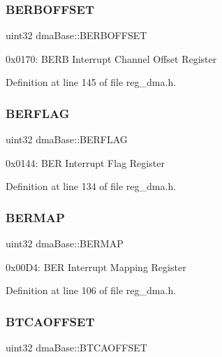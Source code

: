 \subsubsection{\texorpdfstring{B\+E\+R\+B\+O\+F\+F\+S\+ET}{BERBOFFSET}}
{\footnotesize\ttfamily uint32 dma\+Base\+::\+B\+E\+R\+B\+O\+F\+F\+S\+ET}

0x0170\+: B\+E\+RB Interrupt Channel Offset Register 

Definition at line 145 of file reg\+\_\+dma.\+h.

\mbox{\label{structdmaBase_ab280d5d5042d2cab2fd4ef24674acb21}} 
\subsubsection{\texorpdfstring{B\+E\+R\+F\+L\+AG}{BERFLAG}}
{\footnotesize\ttfamily uint32 dma\+Base\+::\+B\+E\+R\+F\+L\+AG}

0x0144\+: B\+ER Interrupt Flag Register 

Definition at line 134 of file reg\+\_\+dma.\+h.

\mbox{\label{structdmaBase_a0f2a81d7ffa07b100bd3581e43140e9d}} 
\subsubsection{\texorpdfstring{B\+E\+R\+M\+AP}{BERMAP}}
{\footnotesize\ttfamily uint32 dma\+Base\+::\+B\+E\+R\+M\+AP}

0x00\+D4\+: B\+ER Interrupt Mapping Register 

Definition at line 106 of file reg\+\_\+dma.\+h.

\mbox{\label{structdmaBase_a53951128e995d73ff9e1bae249f72734}} 
\subsubsection{\texorpdfstring{B\+T\+C\+A\+O\+F\+F\+S\+ET}{BTCAOFFSET}}
{\footnotesize\ttfamily uint32 dma\+Base\+::\+B\+T\+C\+A\+O\+F\+F\+S\+ET}


